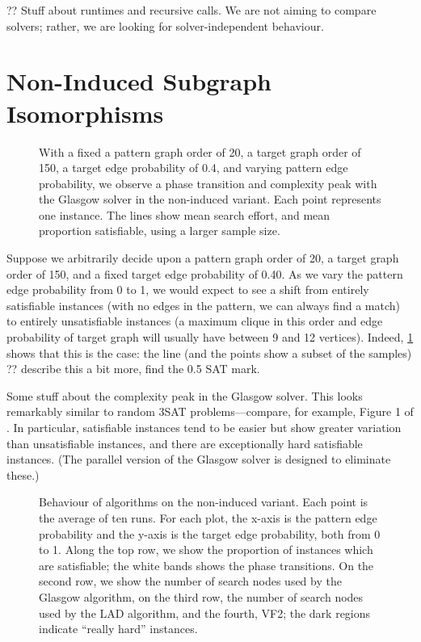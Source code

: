 \documentclass[letterpaper]{article}
\begin{document}
?? Stuff about runtimes and recursive calls. We are not aiming to compare solvers; rather, we are
looking for solver-independent behaviour.

\section{Non-Induced Subgraph Isomorphisms}

\begin{figure}[t]
    
    \caption{With a fixed a pattern graph order of 20, a target graph order of 150, a target edge
        probability of 0.4, and varying pattern edge probability, we observe a phase transition and
        complexity peak with the Glasgow solver in the non-induced variant. Each point represents
        one instance. The lines show mean search effort, and mean proportion satisfiable, using a
    larger sample size.}
    \label{figure:phase-transition}
\end{figure}

Suppose we arbitrarily decide upon a pattern graph order of 20, a target graph order of 150, and a
fixed target edge probability of 0.40. As we vary the pattern edge probability from 0 to 1, we would
expect to see a shift from entirely satisfiable instances (with no edges in the pattern, we can
always find a match) to entirely unsatisfiable instances (a maximum clique in this order and edge
probability of target graph will usually have between 9 and 12 vertices). Indeed,
\cref{figure:phase-transition} shows that this is the case: the line (and the points show a subset
of the samples) ?? describe this a bit more, find the 0.5 SAT mark.

Some stuff about the complexity peak in the Glasgow solver. This looks remarkably similar to random
3SAT problems---compare, for example, Figure 1 of \citet{LeytonBrown:2014}. In particular,
satisfiable instances tend to be easier but show greater variation than unsatisfiable instances, and
there are exceptionally hard satisfiable instances. (The parallel version of the Glasgow solver is
designed to eliminate these.)

\begin{figure}[h]
    
    \caption{Behaviour of algorithms on the non-induced variant. Each point is the average of ten
        runs. For each plot, the x-axis is the pattern edge probability and the y-axis is the target
        edge probability, both from 0 to 1. Along the top row, we show the proportion of instances which are
        satisfiable; the white bands shows the phase transitions. On the second row, we show the
        number of search nodes used by the Glasgow algorithm, on the third row, the number of
        search nodes used by the LAD algorithm, and the fourth, VF2; the dark regions indicate
        ``really hard'' instances.}
    \label{figure:non-induced}
\end{figure}
\end{document}
